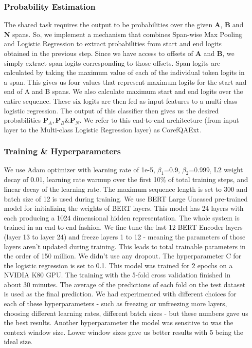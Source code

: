 \documentclass[11pt,a4paper]{article}
\begin{document}
\subsubsection{Probability Estimation}

The shared task requires the output to be probabilities over the given \textbf{A}, \textbf{B} and \textbf{N} spans. So, we implement a mechanism that combines Span-wise Max Pooling and Logistic Regression to extract probabilities from start and end logits obtained in the previous step. Since we have access to offsets of \textbf{A} and \textbf{B}, we simply extract span logits corresponding to those offsets. Span logits are calculated by taking the maximum value of each of the individual token logits in a span. This gives us four values that represent maximum logits for the start and end of A and B spans. We also calculate maximum start and end logits over the entire sequence. These six logits are then fed as input features to a multi-class logistic regression. The output of this classifier then gives us the desired probabilities $\textbf{P}_A, \textbf{P}_B \& \textbf{P}_N$. We refer to this end-to-end architecture (from input layer to the Multi-class Logistic Regression layer) as CorefQAExt.

\subsubsection{Training \& Hyperparameters}

We use Adam optimizer with learning rate of 1e-5, $\beta_1$=0.9, $\beta_2$=0.999, L2 weight decay of 0.01, learning rate warmup over the first 10\% of total training steps, and linear decay of the learning rate. The maximum sequence length is set to 300 and batch size of 12 is used during training. We use BERT Large Uncased pre-trained model for initializing the weights of BERT layers. This model has 24 layers with each producing a 1024 dimensional hidden representation. The whole system is trained in an end-to-end fashion. We fine-tune the last 12 BERT Encoder layers (layer 13 to layer 24) and freeze layers 1 to 12 - meaning the parameters of those layers aren't updated during training. This leads to total trainable parameters in the order of 150 million. We didn't use any dropout. The hyperparameter C for the logistic regression is set to 0.1. This model was trained for 2 epochs on a NVIDIA K80 GPU. The training with the 5-fold cross validation finished in about 30 minutes. The average of the predictions of each fold on the test dataset is used as the final prediction. We had experimented with different choices for each of these hyperparameters - such as freezing or unfreezing more layers, choosing different learning rates, different batch sizes - but these numbers gave us the best results. Another hyperparameter the model was sensitive to was the context window size. Lower window sizes gave us better results with 5 being the ideal size.
\end{document}
